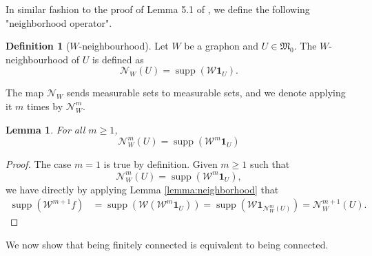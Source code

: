 \documentclass[11pt]{article}
\def\supp{\operatorname{supp}}
\def\II{\bm{1}}
\def\calW{\mathcal{W}}
\def\frakM{\mathfrak{M}_0}
\newtheorem{lemma}{Lemma}[section]
\theoremstyle{definition}
\newtheorem{definition}{Definition}[section]
\begin{document}
In similar fashion to the proof of Lemma 5.1 of \cite{jansonConnectednessGraphLimits2008}, we define the following "neighborhood operator".

\begin{definition}[$W$-neighbourhood]
    Let $W$ be a graphon and $U \in \frakM$. The $W$-neighbourhood of $U$ is defined as
    $$ \mathcal{N}_W (U) = \supp (\calW \II_U). $$ 
\end{definition}
The map $\mathcal{N}_W$ sends measurable sets to measurable sets, and we denote applying it $m$ times by $\mathcal{N}_W^m$.

\begin{lemma} \label{lemma:neighborhood-powers}
    For all $m \ge 1$,
    $$ \mathcal{N}_W^m (U) = \supp (\calW^m \II_U) $$
\end{lemma}
\begin{proof}
    The case $m=1$ is true by definition. Given $m\ge 1$ such that 
    $$ \mathcal{N}_W^m (U) = \supp (\calW^m \II_U), $$
    we have directly by applying Lemma \ref{lemma:neighborhood} that
    \begin{align*}
        \supp(\calW^{m+1} f) &= \supp (\calW (\calW^m \II_U)) = \supp (\calW \II_{\mathcal{N}_W^m (U)}) = \mathcal{N}_W^{m+1} (U).
    \end{align*}
\end{proof}

We now show that being finitely connected is equivalent to being connected.
\end{document}
